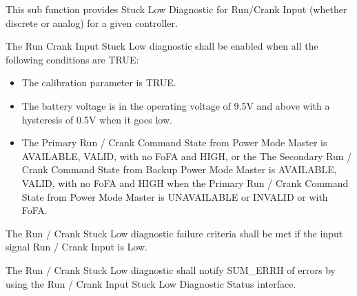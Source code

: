 {This sub function provides Stuck Low Diagnostic for Run/Crank Input (whether discrete or analog) for a given controller.
}
{  }

{The Run Crank Input Stuck Low diagnostic shall be enabled when all the following conditions are TRUE:
\begin{itemize}
\item The calibration parameter  is TRUE.
\item The battery voltage is in the operating voltage of 9.5V and above with a hysteresis of 0.5V when it goes low.
\item The Primary Run / Crank Command State from Power Mode Master is AVAILABLE, VALID, with no FoFA and HIGH,
or the The Secondary Run / Crank Command State from Backup Power Mode Master is AVAILABLE, VALID, with no FoFA and HIGH
when the Primary Run / Crank Command State from Power Mode Master is UNAVAILABLE or INVALID or with FoFA.
\end{itemize}
}
{}

{The Run / Crank Stuck Low diagnostic failure criteria shall be met if the input signal Run / Crank Input is Low.
}
{}

{The Run / Crank Stuck Low diagnostic shall notify SUM_ERRH of errors by using the Run / Crank Input Stuck Low Diagnostic Status interface.
}
{ }

